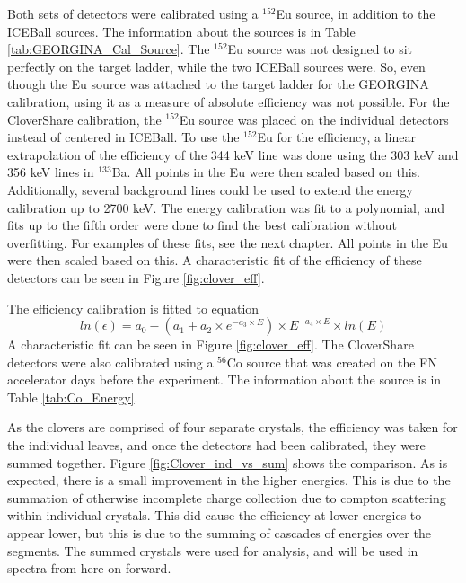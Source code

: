 Both sets of detectors were calibrated using a $^{152}$Eu source, in addition to the ICEBall sources. The information about the sources is in Table \ref{tab:GEORGINA_Cal_Source}. The $^{152}$Eu source was not designed to sit perfectly on the target ladder, while the two ICEBall sources were. So, even though the Eu source was attached to the target ladder for the GEORGINA calibration, using it as a measure of absolute efficiency was not possible. For the CloverShare calibration, the $^{152}$Eu source was placed on the individual detectors instead of centered in ICEBall. To use the $^{152}$Eu for the efficiency, a linear extrapolation of the efficiency of the 344 keV line was done using the 303 keV and 356 keV lines in $^{133}$Ba. All points in the Eu were then scaled based on this. Additionally, several background lines could be used to extend the energy calibration up to 2700 keV. The energy calibration was fit to a polynomial, and fits up to the fifth order were done to find the best calibration without overfitting. For examples of these fits, see the next chapter. All points in the Eu were then scaled based on this. A characteristic fit of the efficiency of these detectors can be seen in Figure \ref{fig:clover_eff}.



The efficiency calibration is fitted to equation
\begin{equation}
    ln(\epsilon) = a_0-(a_1+a_2\times e^{-a_3\times E})\times E^{-a_4\times E}\times ln(E)
    \label{eq:Ge_Eff}
\end{equation}
A characteristic fit can be seen in Figure \ref{fig:clover_eff}. The CloverShare detectors were also calibrated using a $^{56}$Co source that was created on the FN accelerator days before the experiment. The information about the source is in Table \ref{tab:Co_Energy}. 





As the clovers are comprised of four separate crystals, the efficiency was taken for the individual leaves, and once the detectors had been calibrated, they were summed together. Figure \ref{fig:Clover_ind_vs_sum} shows the comparison. As is expected, there is a small improvement in the higher energies. This is due to the summation of otherwise incomplete charge collection due to compton scattering within individual crystals. This did cause the efficiency at lower energies to appear lower, but this is due to the summing of cascades of energies over the segments. The summed crystals were used for analysis, and will be used in spectra from here on forward.

